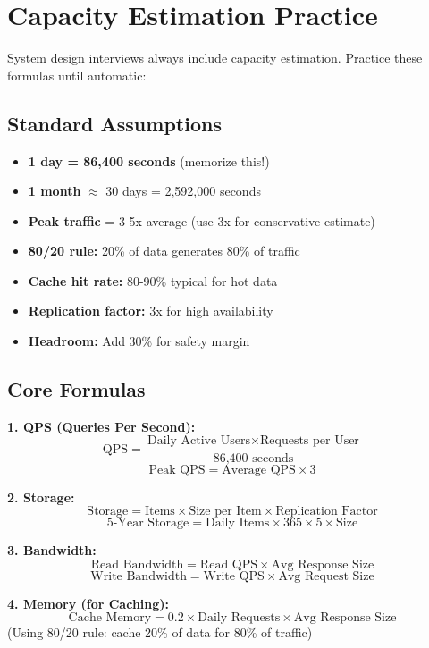 \documentclass[10pt]{article}
\begin{document}
\section{Capacity Estimation Practice}

System design interviews always include capacity estimation. Practice these formulas until automatic:

\subsection{Standard Assumptions}
\begin{itemize}
\item \textbf{1 day = 86,400 seconds} (memorize this!)
\item \textbf{1 month} $\approx$ 30 days = 2,592,000 seconds
\item \textbf{Peak traffic} = 3-5x average (use 3x for conservative estimate)
\item \textbf{80/20 rule:} 20\% of data generates 80\% of traffic
\item \textbf{Cache hit rate:} 80-90\% typical for hot data
\item \textbf{Replication factor:} 3x for high availability
\item \textbf{Headroom:} Add 30\% for safety margin
\end{itemize}

\subsection{Core Formulas}

\textbf{1. QPS (Queries Per Second):}
\[
\text{QPS} = \frac{\text{Daily Active Users} \times \text{Requests per User}}{\text{86,400 seconds}}
\]
\[
\text{Peak QPS} = \text{Average QPS} \times 3
\]

\textbf{2. Storage:}
\[
\text{Storage} = \text{Items} \times \text{Size per Item} \times \text{Replication Factor}
\]
\[
\text{5-Year Storage} = \text{Daily Items} \times 365 \times 5 \times \text{Size}
\]

\textbf{3. Bandwidth:}
\[
\text{Read Bandwidth} = \text{Read QPS} \times \text{Avg Response Size}
\]
\[
\text{Write Bandwidth} = \text{Write QPS} \times \text{Avg Request Size}
\]

\textbf{4. Memory (for Caching):}
\[
\text{Cache Memory} = 0.2 \times \text{Daily Requests} \times \text{Avg Response Size}
\]
(Using 80/20 rule: cache 20\% of data for 80\% of traffic)
\end{document}
